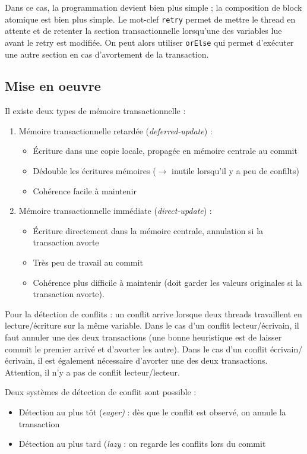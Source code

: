 \documentclass{article}
\begin{document}
Dans ce cas, la programmation devient bien plus simple ; la composition de block atomique est bien plus simple. Le mot-clef \texttt{retry} permet de mettre le thread en attente et de retenter la section transactionnelle lorsqu'une des variables lue avant le retry est modifiée. On peut alors utiliser \texttt{orElse} qui permet d'exécuter une autre section en cas d'avortement de la transaction.


\subsection{Mise en oeuvre}
Il existe deux types de mémoire transactionnelle :
\begin{enumerate}
\item Mémoire transactionnelle retardée (\emph{deferred-update}) :
\begin{itemize}
\item Écriture dans une copie locale, propagée en mémoire centrale au commit
\item Dédouble les écritures mémoires ($\to$ inutile lorsqu'il y a peu de confilts)
\item Cohérence facile à maintenir
\end{itemize}
\item Mémoire transactionnelle immédiate (\emph{direct-update}) :
\begin{itemize}
\item Écriture directement dans la mémoire centrale, annulation si la transaction avorte
\item Très peu de travail au commit
\item Cohérence plus difficile à maintenir (doit garder les valeurs originales si la transaction avorte).
\end{itemize}
\end{enumerate}
\bigskip


Pour la détection de conflits : un conflit arrive lorsque deux threads travaillent en lecture/écriture sur la même variable. Dans le cas d'un conflit lecteur/écrivain, il faut annuler une des deux transactions (une bonne heuristique est de laisser commit le premier arrivé et d'avorter les autre). Dans le cas d'un conflit écrivain/écrivain, il est également nécessaire d'avorter une des deux transactions. Attention, il n'y a pas de conflit lecteur/lecteur.
\medskip


Deux systèmes de détection de conflit sont possible :
\begin{itemize}
\item Détection au plus tôt (\emph{eager)} : dès que le conflit est observé, on annule la transaction
\item Détection au plus tard (\emph{lazy} : on regarde les conflits lors du commit
\end{itemize}
\medskip
\end{document}
